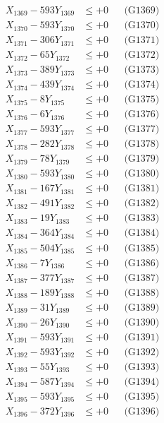 \documentclass[a4paper,10pt]{article}
\begin{document}
{\begin{align}
X_{1369} - 593Y_{1369} &\leq +0 && \text{(G1369)} \\
X_{1370} - 593Y_{1370} &\leq +0 && \text{(G1370)} \\
\allowbreak
X_{1371} - 306Y_{1371} &\leq +0 && \text{(G1371)} \\
X_{1372} - 65Y_{1372} &\leq +0 && \text{(G1372)} \\
X_{1373} - 389Y_{1373} &\leq +0 && \text{(G1373)} \\
X_{1374} - 439Y_{1374} &\leq +0 && \text{(G1374)} \\
X_{1375} - 8Y_{1375} &\leq +0 && \text{(G1375)} \\
X_{1376} - 6Y_{1376} &\leq +0 && \text{(G1376)} \\
X_{1377} - 593Y_{1377} &\leq +0 && \text{(G1377)} \\
X_{1378} - 282Y_{1378} &\leq +0 && \text{(G1378)} \\
X_{1379} - 78Y_{1379} &\leq +0 && \text{(G1379)} \\
X_{1380} - 593Y_{1380} &\leq +0 && \text{(G1380)} \\
\allowbreak
X_{1381} - 167Y_{1381} &\leq +0 && \text{(G1381)} \\
X_{1382} - 491Y_{1382} &\leq +0 && \text{(G1382)} \\
X_{1383} - 19Y_{1383} &\leq +0 && \text{(G1383)} \\
X_{1384} - 364Y_{1384} &\leq +0 && \text{(G1384)} \\
X_{1385} - 504Y_{1385} &\leq +0 && \text{(G1385)} \\
X_{1386} - 7Y_{1386} &\leq +0 && \text{(G1386)} \\
X_{1387} - 377Y_{1387} &\leq +0 && \text{(G1387)} \\
X_{1388} - 189Y_{1388} &\leq +0 && \text{(G1388)} \\
X_{1389} - 31Y_{1389} &\leq +0 && \text{(G1389)} \\
X_{1390} - 26Y_{1390} &\leq +0 && \text{(G1390)} \\
\allowbreak
X_{1391} - 593Y_{1391} &\leq +0 && \text{(G1391)} \\
X_{1392} - 593Y_{1392} &\leq +0 && \text{(G1392)} \\
X_{1393} - 55Y_{1393} &\leq +0 && \text{(G1393)} \\
X_{1394} - 587Y_{1394} &\leq +0 && \text{(G1394)} \\
X_{1395} - 593Y_{1395} &\leq +0 && \text{(G1395)} \\
X_{1396} - 372Y_{1396} &\leq +0 && \text{(G1396)} \\

\end{align}}
\end{document}
